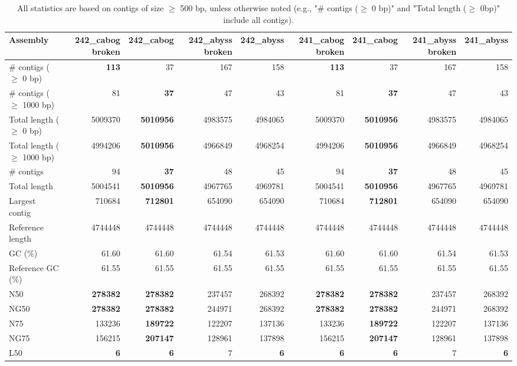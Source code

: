 \documentclass[12pt,a4paper]{article}
\begin{document}
\begin{table}[ht]
\begin{center}
\caption{All statistics are based on contigs of size $\geq$ 500 bp, unless otherwise noted (e.g., "\# contigs ($\geq$ 0 bp)" and "Total length ($\geq$ 0bp)" include all contigs).}
\begin{tabular}{|l*{8}{|r}|}
\hline
Assembly & 242\_cabog broken & 242\_cabog & 242\_abyss broken & 242\_abyss & 241\_cabog broken & 241\_cabog & 241\_abyss broken & 241\_abyss \\ \hline
\# contigs ($\geq$ 0 bp) & {\bf 113} & 37 & 167 & 158 & {\bf 113} & 37 & 167 & 158 \\ \hline
\# contigs ($\geq$ 1000 bp) & 81 & {\bf 37} & 47 & 43 & 81 & {\bf 37} & 47 & 43 \\ \hline
Total length ($\geq$ 0 bp) & 5009370 & {\bf 5010956} & 4983575 & 4984065 & 5009370 & {\bf 5010956} & 4983575 & 4984065 \\ \hline
Total length ($\geq$ 1000 bp) & 4994206 & {\bf 5010956} & 4966849 & 4968254 & 4994206 & {\bf 5010956} & 4966849 & 4968254 \\ \hline
\# contigs & 94 & {\bf 37} & 48 & 45 & 94 & {\bf 37} & 48 & 45 \\ \hline
Total length & 5004541 & {\bf 5010956} & 4967765 & 4969781 & 5004541 & {\bf 5010956} & 4967765 & 4969781 \\ \hline
Largest contig & 710684 & {\bf 712801} & 654090 & 654090 & 710684 & {\bf 712801} & 654090 & 654090 \\ \hline
Reference length & 4744448 & 4744448 & 4744448 & 4744448 & 4744448 & 4744448 & 4744448 & 4744448 \\ \hline
GC (\%) & 61.60 & 61.60 & 61.54 & 61.53 & 61.60 & 61.60 & 61.54 & 61.53 \\ \hline
Reference GC (\%) & 61.55 & 61.55 & 61.55 & 61.55 & 61.55 & 61.55 & 61.55 & 61.55 \\ \hline
N50 & {\bf 278382} & {\bf 278382} & 237457 & 268392 & {\bf 278382} & {\bf 278382} & 237457 & 268392 \\ \hline
NG50 & {\bf 278382} & {\bf 278382} & 244971 & 268392 & {\bf 278382} & {\bf 278382} & 244971 & 268392 \\ \hline
N75 & 133236 & {\bf 189722} & 122207 & 137136 & 133236 & {\bf 189722} & 122207 & 137136 \\ \hline
NG75 & 156215 & {\bf 207147} & 128961 & 137898 & 156215 & {\bf 207147} & 128961 & 137898 \\ \hline
L50 & {\bf 6} & {\bf 6} & 7 & {\bf 6} & {\bf 6} & {\bf 6} & 7 & {\bf 6} \\ \hline

\end{tabular}
\end{center}
\end{table}
\end{document}
